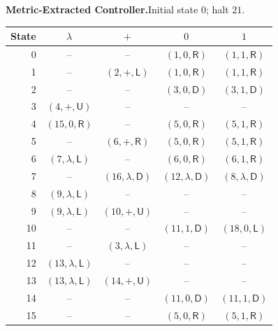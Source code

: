 \documentclass[11pt,a4paper]{article}
\newcommand{\blank}{\lambda}
\newcommand{\triple}[3]{(#1,#2,\mathsf{#3})}
\begin{document}
\vspace{5pt}
\textbf{Metric-Extracted Controller.}\quad Initial state $0$; halt $21$.
\begin{center}
\fontsize{9.4}{11.2}\selectfont\renewcommand{\arraystretch}{1.06}
\setlength{\tabcolsep}{10pt}
\begin{tabular}{rcccc}
\toprule
\rowcolor{Pale}State & $\blank$ & $+$ & $0$ & $1$\\
\midrule
0 & \textcolor{Muted}{--} & \textcolor{Muted}{--} & $\triple{1}{0}{R}$ & $\triple{1}{1}{R}$ \\
1 & \textcolor{Muted}{--} & $\triple{2}{+}{L}$ & $\triple{1}{0}{R}$ & $\triple{1}{1}{R}$ \\
2 & \textcolor{Muted}{--} & \textcolor{Muted}{--} & $\triple{3}{0}{D}$ & $\triple{3}{1}{D}$ \\
3 & $\triple{4}{+}{U}$ & \textcolor{Muted}{--} & \textcolor{Muted}{--} & \textcolor{Muted}{--} \\
4 & $\triple{15}{0}{R}$ & \textcolor{Muted}{--} & $\triple{5}{0}{R}$ & $\triple{5}{1}{R}$ \\
5 & \textcolor{Muted}{--} & $\triple{6}{+}{R}$ & $\triple{5}{0}{R}$ & $\triple{5}{1}{R}$ \\
6 & $\triple{7}{\blank}{L}$ & \textcolor{Muted}{--} & $\triple{6}{0}{R}$ & $\triple{6}{1}{R}$ \\
7 & \textcolor{Muted}{--} & $\triple{16}{\blank}{D}$ & $\triple{12}{\blank}{D}$ & $\triple{8}{\blank}{D}$ \\
8 & $\triple{9}{\blank}{L}$ & \textcolor{Muted}{--} & \textcolor{Muted}{--} & \textcolor{Muted}{--} \\
9 & $\triple{9}{\blank}{L}$ & $\triple{10}{+}{U}$ & \textcolor{Muted}{--} & \textcolor{Muted}{--} \\
10 & \textcolor{Muted}{--} & \textcolor{Muted}{--} & $\triple{11}{1}{D}$ & $\triple{18}{0}{L}$ \\
11 & \textcolor{Muted}{--} & $\triple{3}{\blank}{L}$ & \textcolor{Muted}{--} & \textcolor{Muted}{--} \\
12 & $\triple{13}{\blank}{L}$ & \textcolor{Muted}{--} & \textcolor{Muted}{--} & \textcolor{Muted}{--} \\
13 & $\triple{13}{\blank}{L}$ & $\triple{14}{+}{U}$ & \textcolor{Muted}{--} & \textcolor{Muted}{--} \\
14 & \textcolor{Muted}{--} & \textcolor{Muted}{--} & $\triple{11}{0}{D}$ & $\triple{11}{1}{D}$ \\
15 & \textcolor{Muted}{--} & \textcolor{Muted}{--} & $\triple{5}{0}{R}$ & $\triple{5}{1}{R}$ \\

\end{tabular}
\end{center}
\end{document}
